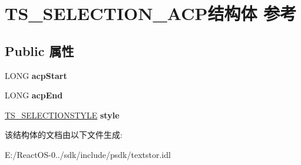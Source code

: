 \hypertarget{struct_t_s___s_e_l_e_c_t_i_o_n___a_c_p}{}\section{T\+S\+\_\+\+S\+E\+L\+E\+C\+T\+I\+O\+N\+\_\+\+A\+C\+P结构体 参考}
\label{struct_t_s___s_e_l_e_c_t_i_o_n___a_c_p}
\subsection*{Public 属性}
\begin{DoxyCompactItemize}
\item 
\mbox{\label{struct_t_s___s_e_l_e_c_t_i_o_n___a_c_p_a4600e2e68f1a2869002064f59eb138cb}} 
L\+O\+NG {\bfseries acp\+Start}
\item 
\mbox{\label{struct_t_s___s_e_l_e_c_t_i_o_n___a_c_p_ab51d77ebc74d550e035d47b454416ba9}} 
L\+O\+NG {\bfseries acp\+End}
\item 
\mbox{\label{struct_t_s___s_e_l_e_c_t_i_o_n___a_c_p_a900591aeac7b8745454d5217196cd9c7}} 
\hyperlink{struct_t_s___s_e_l_e_c_t_i_o_n_s_t_y_l_e}{T\+S\+\_\+\+S\+E\+L\+E\+C\+T\+I\+O\+N\+S\+T\+Y\+LE} {\bfseries style}
\end{DoxyCompactItemize}


该结构体的文档由以下文件生成\+:\begin{DoxyCompactItemize}
\item 
E\+:/\+React\+O\+S-\/0../sdk/include/psdk/textstor.\+idl\end{DoxyCompactItemize}
